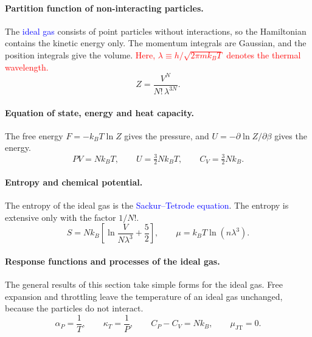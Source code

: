 \paragraph{Partition function of non-interacting particles.}
The \textcolor{blue}{ideal gas} consists of point particles without
interactions, so the Hamiltonian contains the kinetic energy only. The
momentum integrals are Gaussian, and the position integrals give the
volume. \textcolor{red}{Here, $\lambda\equiv h/\sqrt{2\pi mk_BT}$ denotes the
thermal wavelength.}
\begin{equation}
    \boxed{Z=\frac{V^N}{N!\,\lambda^{3N}}.}
\end{equation}

\paragraph{Equation of state, energy and heat capacity.}
The free energy $F=-k_BT\ln Z$ gives the pressure, and
$U=-\partial\ln Z/\partial\beta$ gives the energy.
\begin{equation}
    \boxed{PV=Nk_BT,\qquad U=\tfrac{3}{2}Nk_BT,\qquad C_V=\tfrac{3}{2}Nk_B.}
\end{equation}

\paragraph{Entropy and chemical potential.}
The entropy of the ideal gas is the \textcolor{blue}{Sackur--Tetrode
equation}. The entropy is extensive only with the factor $1/N!$.
\begin{equation}
    \boxed{S=Nk_B\left[\ln\frac{V}{N\lambda^3}+\frac{5}{2}\right],\qquad
    \mu=k_BT\ln\!\left(n\lambda^3\right).}
\end{equation}

\paragraph{Response functions and processes of the ideal gas.}
The general results of this section take simple forms for the ideal gas.
Free expansion and throttling leave the temperature of an ideal gas
unchanged, because the particles do not interact.
\begin{equation}
    \boxed{\alpha_P=\frac{1}{T},\qquad\kappa_T=\frac{1}{P},\qquad
    C_P-C_V=Nk_B,\qquad\mu_{\text{JT}}=0.}
\end{equation}


